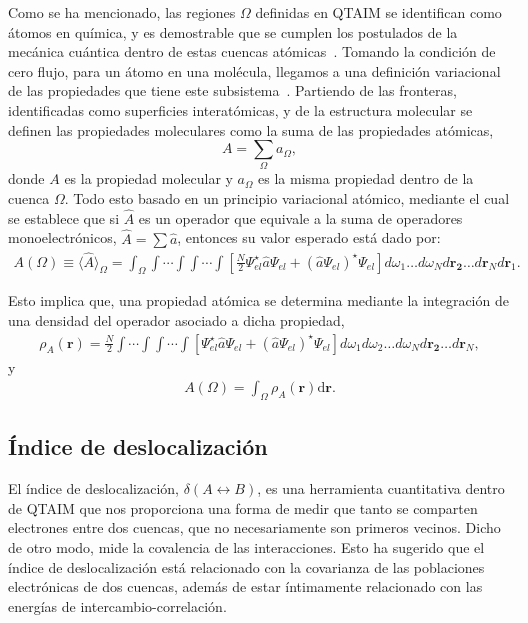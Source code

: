 Como se ha mencionado, las regiones $\Omega$ definidas en QTAIM se identifican
como átomos en química, y es demostrable que se cumplen los postulados de la
mecánica cuántica dentro de estas cuencas atómicas~\cite{bader}. Tomando la
condición de cero flujo, para un átomo en una molécula, llegamos a una
definición variacional de las propiedades que tiene este
subsistema~\cite{Bieglerknig1982}. Partiendo de las fronteras, identificadas
como superficies interatómicas, y de la estructura molecular se definen las
propiedades moleculares como la suma de las propiedades atómicas,
\begin{equation}
  A = \sum_{\Omega}{a_{\Omega}},
  \label{promoleculares}
\end{equation}
\noindent donde $A$ es la propiedad molecular y $a_{\Omega}$ es la misma
propiedad dentro de la cuenca $\Omega$. Todo esto basado en un principio
variacional atómico, mediante el cual se establece que si $\hat{A}$ es un
operador que equivale a la suma de operadores monoelectrónicos,
$\hat{A}=\sum\hat{a}$, entonces su valor esperado está dado por:
\begin{align}
  A(\Omega) \equiv \langle\widehat{A}\rangle_{\Omega} = \int_{\Omega}\int\cdots\int\int\cdots\int
  \left [ \frac{N}{2}\Psi_{el}^{\star}\hat{a}\Psi_{el} + (\hat{a}\Psi_{el})^{\star}\Psi_{el}\right ]
  d\omega_{1}\ldots d\omega_{N}d\mathbf{r_2}\ldots d\mathbf{r}_{N}d\mathbf{r}_{1} .
\end{align}

Esto implica que, una propiedad atómica se determina mediante la integración de
una densidad del operador asociado a dicha propiedad,
\begin{align}
  \rho_{A}(\mathbf{r})=\frac{N}{2}\int\cdots\int\int\cdots\int[
  \Psi_{el}^{\star}\hat{a}\Psi_{el} + (\hat{a}\Psi_{el})^{\star}\Psi_{el}]
  d\omega_{1}d\omega_{2}\ldots d\omega_{N}d\mathbf{r_2}\ldots d\mathbf{r}_N ,
\end{align}
y
\begin{align}
  A(\Omega)=\int_{\Omega}\rho_{A}(\mathbf{r})\mathrm{d}\mathbf{r} .
\end{align}

\subsection{Índice de deslocalización}

El índice de deslocalización, $\delta(A \leftrightarrow B)$, es una herramienta
cuantitativa dentro de QTAIM que  nos proporciona una forma de medir que tanto
se comparten electrones entre dos cuencas, que no necesariamente son primeros
vecinos. Dicho de otro modo, mide la covalencia de las interacciones. Esto ha
sugerido que el índice de deslocalización está relacionado con la covarianza de
las poblaciones electrónicas de dos cuencas, además de estar íntimamente
relacionado con las energías de intercambio-correlación.

